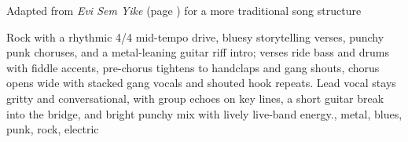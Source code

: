
\begin{notes}
Adapted from \emph{Evi Sem Yike} (page \pageref{sec:evi-sem-yike}) for a more traditional song structure
\end{notes}
\begin{style}
Rock with a rhythmic 4/4 mid-tempo drive, bluesy storytelling verses, punchy punk choruses, and a metal-leaning guitar riff intro; verses ride bass and drums with fiddle accents, pre-chorus tightens to handclaps and gang shouts, chorus opens wide with stacked gang vocals and shouted hook repeats. %
Lead vocal stays gritty and conversational, with group echoes on key lines, a short guitar break into the bridge, and bright punchy mix with lively live-band energy., metal, blues, punk, rock, electric
\end{style}
